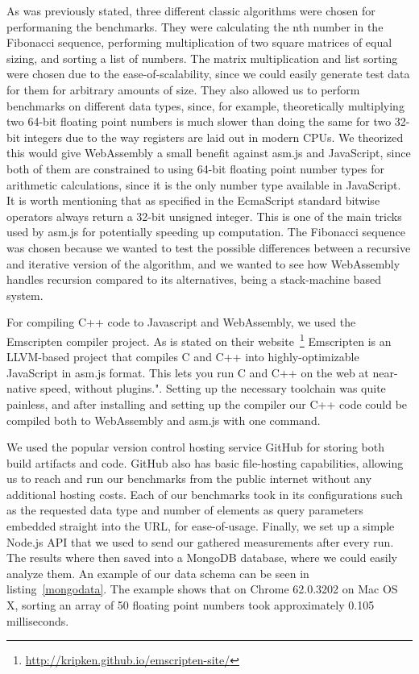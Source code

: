 \documentclass[conference]{IEEEtran}
\begin{document}
As was previously stated, three different classic algorithms were chosen for
performaning the benchmarks. They were calculating the nth number in the
Fibonacci sequence, performing multiplication of two square matrices of equal
sizing, and sorting a list of numbers. The matrix multiplication and list
sorting were chosen due to the ease-of-scalability, since we could easily
generate test data for them for arbitrary amounts of size. They also allowed us
to perform benchmarks on different data types, since, for example,
theoretically multiplying two 64-bit floating point numbers is much slower than
doing the same for two 32-bit integers due to the way registers are laid out in
modern CPUs. We theorized this would give WebAssembly a small benefit against
asm.js and JavaScript, since both of them are constrained to using 64-bit
floating point number types for arithmetic calculations, since it is the only
number type available in JavaScript. It is worth mentioning that as specified
in the EcmaScript standard\cite{EcmaScript} bitwise operators always return a
32-bit unsigned integer. This is one of the main tricks used by asm.js for
potentially speeding up computation. The Fibonacci sequence was chosen
because we wanted to test the possible differences between a recursive and
iterative version of the algorithm, and we wanted to see how WebAssembly
handles recursion compared to its alternatives, being a stack-machine based
system.

For compiling C++ code to Javascript and WebAssembly, we used the Emscripten
compiler project. As is stated on their
website~\footnote{\url{http://kripken.github.io/emscripten-site/}} Emscripten
is an LLVM-based project that compiles C and C++ into highly-optimizable
JavaScript in asm.js format. This lets you run C and C++ on the web at
near-native speed, without plugins.". Setting up the necessary toolchain was
quite painless, and after installing and setting up the compiler our C++ code
could be compiled both to WebAssembly and asm.js with one command.

We used the popular version control hosting service GitHub for storing both
build artifacts and code. GitHub also has basic file-hosting capabilities,
allowing us to reach and run our benchmarks from the public internet without
any additional hosting costs. Each of our benchmarks took in its configurations
such as the requested data type and number of elements as query parameters
embedded straight into the URL, for ease-of-usage. Finally, we set up a simple
Node.js API that we used to send our gathered measurements after every run. The
results where then saved into a MongoDB database, where we could easily analyze
them. An example of our data schema can be seen in listing~\ref{mongodata}. The
example shows that on Chrome 62.0.3202 on Mac OS X, sorting an array of 50
floating point numbers took approximately 0.105 milliseconds.
\end{document}

